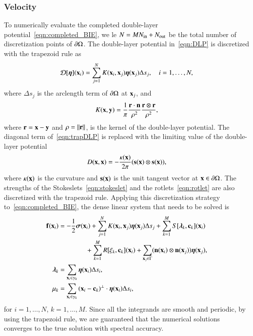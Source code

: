 \documentclass[preprint, 10pt]{elsarticle}
\begin{document}
\subsubsection{Velocity}
To numerically evaluate the completed double-layer
potential~\eqref{eqn:completed_BIE}, we le $N = MN_{\mathrm{in}} + N_{\mathrm{out}}$ be the
total number of discretization points of ${\partial}\Omega$.  The double-layer
potential in~\eqref{eqn:DLP} is discretized with the trapezoid rule as
\begin{align}
  {\mathcal{D}}[{\boldsymbol\eta}]({\mathbf{x}}_i) = \sum_{j=1}^{N} K({\mathbf{x}}_i,{\mathbf{x}}_j) {\boldsymbol\eta}({\mathbf{x}}_j) 
      \Delta s_{j}, \quad i=1,\ldots,N,
  \label{eqn:trapDLP}
\end{align}
where $\Delta s_j$ is the arclength term of ${\partial}\Omega$ at
${\mathbf{x}}_j$, and
\begin{align*}
  K({\mathbf{x}},{\mathbf{y}}) = \frac{1}{\pi} \frac{{\mathbf{r}} \cdot {\mathbf{n}}}{\rho^2} 
      \frac{{\mathbf{r}} \otimes {\mathbf{r}}}{\rho^2},
\end{align*}
where ${\mathbf{r}} = {\mathbf{x}} - {\mathbf{y}}$ and $\rho = \|{\mathbf{r}}\|$, is the kernel of the
double-layer potential.  The diagonal term of~\eqref{eqn:trapDLP} is
replaced with the limiting value of the double-layer potential
\begin{align*}
  D({\mathbf{x}},{\mathbf{x}}) = -\frac{\kappa({\mathbf{x}})}{2\pi}({\mathbf{s}}({\mathbf{x}}) \otimes {\mathbf{s}}({\mathbf{x}})),
\end{align*}
where $\kappa({\mathbf{x}})$ is the curvature and ${\mathbf{s}}({\mathbf{x}})$ is the unit tangent
vector at ${\mathbf{x}} \in {\partial}\Omega$.  The strengths of the
Stokeslets~\eqref{eqn:stokeslet} and the rotlets~\eqref{eqn:rotlet} are
also discretized with the trapezoid rule.  Applying this discretization
strategy to~\eqref{eqn:completed_BIE}, the dense linear system that
needs to be solved is
\begin{equation}
  \label{eqn:completed_BIE_discretized}
  \begin{aligned}
    {\mathbf{f}}({\mathbf{x}}_i) &= -\frac{1}{2}{\boldsymbol\sigma}({\mathbf{x}}_i) + \sum_{j=1}^{N} 
      K({\mathbf{x}}_i,{\mathbf{x}}_j) {\boldsymbol\eta}({\mathbf{x}}_j) \Delta s_{j} + 
      \sum_{k=1}^M S[{\boldsymbol\lambda}_k,{\mathbf{c}}_k]({\mathbf{x}}_i) \\
      &\hspace{40pt}
      +\sum_{k=1}^M R[\xi_k,{\mathbf{c}}_k]({\mathbf{x}}_i) 
      +\sum_{{\mathbf{x}}_j \in \Gamma} ({\mathbf{n}}({\mathbf{x}}_i) \otimes
      {\mathbf{n}}({\mathbf{x}}_j)){\boldsymbol\eta}({\mathbf{x}}_j), \\
    {\boldsymbol\lambda}_k &= \sum_{{\mathbf{x}}_i \in \gamma_k} {\boldsymbol\eta}({\mathbf{x}}_i) 
      \Delta s_i, \\ 
    \mu_k &= \sum_{{\mathbf{x}}_i \in \gamma_k}
      {({\mathbf{x}}_i - {\mathbf{c}}_k)}^\perp \cdot {\boldsymbol\eta}({\mathbf{x}}_i) \Delta s_i,
  \end{aligned}
\end{equation}
for $i=1,\ldots,N$, $k=1,\ldots,M$.  Since all the integrands are smooth
and periodic, by using the trapezoid rule, we are guaranteed that the
numerical solutions converges to the true solution with spectral
accuracy.
\end{document}
